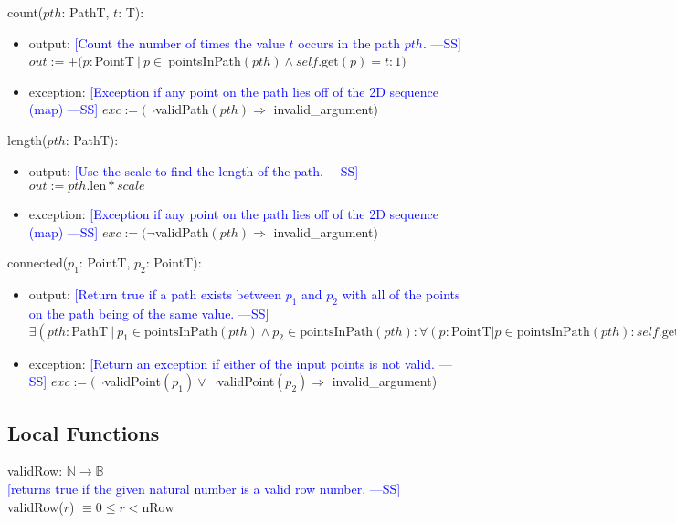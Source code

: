 \documentclass[12pt]{article}
\newcommand{\authornote}[3]{\textcolor{#1}{[#3 ---#2]}}
\newcommand{\authornote}[3]{}
\newcommand{\wss}[1]{\authornote{blue}{SS}{#1}}
\begin{document}
\noindent count($\mathit{pth}$: PathT, $t$: T):
\begin{itemize}
\item output:  \wss{Count the number of times the value $t$ occurs in the path
    $pth$.} $out := +(p : $PointT$ \ | \ p \in \ $pointsInPath$(pth) \land self.\mbox{get}(p) = t : 1)$ 
\item exception: \wss{Exception if any point on the path lies off of the 2D
    sequence (map)} $exc := (\lnot$validPath$(pth) \Rightarrow $ invalid\_argument)
\end{itemize}

\noindent length($\mathit{pth}$: PathT):
\begin{itemize}
\item output:  \wss{Use the scale to find the length of the
    path.} $out := pth.\mbox{len}*scale$
\item exception: \wss{Exception if any point on the path lies off of the 2D
    sequence (map)}  $exc := (\lnot$validPath$(pth) \Rightarrow $ invalid\_argument)
\end{itemize}

\noindent connected($p_1$: PointT, $p_2$: PointT):
\begin{itemize}
\item output: \wss{Return true if a path exists between $p_1$ and $p_2$ with all
    of the points on the path being of the same value.} \\
    $\exists (pth : \mbox{PathT} \ | \ p_1 \in \mbox{pointsInPath}(pth) \land p_2 \in \mbox{pointsInPath}(pth) : \forall (p : \mbox{PointT} | p \in \mbox{pointsInPath}(pth) : self.\mbox{get}(pth.\mbox{strt()}) = self.\mbox{get}(p)))$
\item exception:  \wss{Return an exception if either of the input points is not
    valid.} $exc := (\lnot$validPoint$(p_1) \lor \lnot$validPoint$(p_2) \Rightarrow $ invalid\_argument)

\end{itemize}

\subsection*{Local Functions}

\noindent validRow: $\mathbb{N} \rightarrow \mathbb{B}$\\
\noindent \wss{returns true if the given natural number is a valid row
  number.}\\ validRow($r$) $ \equiv 0 \leq r < \mbox{nRow } $ \\
\end{document}
